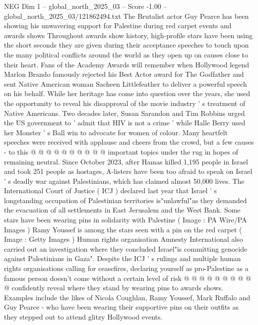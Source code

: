 \begin{textsample}{NEG Dim 1 – global\_north\_2025\_03 – Score -1.00 – global\_north\_2025\_03/121862494.txt}  \label{ex:f1_neg_034}
The Brutalist actor Guy Pearce has been showing his unwavering support for Palestine during red carpet events and awards shows Throughout awards show history, high-profile stars have been using the short seconds they are given during their acceptance speeches to touch upon the many political conflicts around the world as they open up on causes close to their heart.
Fans of the Academy Awards will remember when Hollywood legend Marlon Brando famously rejected his Best Actor award for The Godfather and sent Native American woman Sacheen Littlefeather to deliver a powerful speech on his behalf.
While her heritage has come into question over the years, she used the opportunity to reveal his disapproval of the movie industry ' s treatment of Native Americans.
Two decades later, Susan Sarandon and Tim Robbins urged the US government to ' admit that HIV is not a crime ' while Halle Berry used her Monster ' s Ball win to advocate for women of colour.
Many heartfelt speeches were received with applause and cheers from the crowd, but a few causes - to this @ @ @ @ @ @ @ @ @ @ important topics under the rug in hopes of remaining neutral.
Since October 2023, after Hamas killed 1,195 people in Israel and took 251 people as hostages, A-listers have been too afraid to speak on Israel ' s deadly war against Palestinians, which has claimed almost 50,000 lives.
The International Court of Justice ( ICJ ) declared last year that Israel ' s longstanding occupation of Palestinian territories is"unlawful"as they demanded the evacuation of all settlements in East Jerusalem and the West Bank.
Some stars have been wearing pins in solidarity with Palestine ( Image : PA Wire/PA Images ) Ramy Youssef is among the stars seen with a pin on the red carpet ( Image : Getty Images ) Human rights organisation Amnesty International also carried out an investigation where they concluded Israel"is committing genocide against Palestinians in Gaza".
Despite the ICJ ' s rulings and multiple human rights organisations calling for ceasefires, declaring yourself as pro-Palestine as a famous person doesn't come without a certain level of risk @ @ @ @ @ @ @ @ @ @ confidently reveal where they stand by wearing pins to awards shows.
Examples include the likes of Nicola Coughlan, Ramy Youssef, Mark Ruffalo and Guy Pearce - who have been wearing their supportive pins on their outfits as they stepped out to attend glitzy Hollywood events.

\end{textsample}
